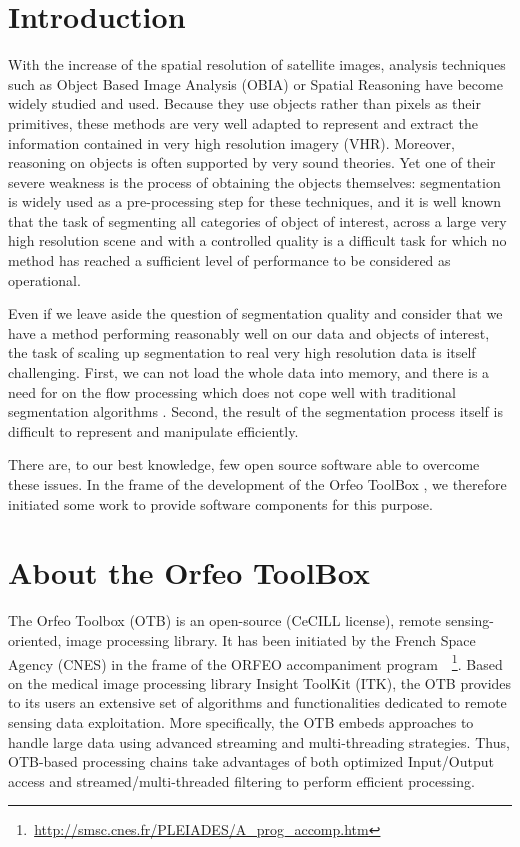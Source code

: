 \documentclass{josis}
\newcommand{\furl}[1]{    $\,$\footnote{$\,$\url{#1}}}
\begin{document}
\section{Introduction}

With the increase of the spatial resolution of satellite images,
analysis techniques such as Object Based Image Analysis (OBIA) or Spatial
Reasoning \cite{inglada2009qualitative} have become widely studied and
used. Because they use objects rather than pixels as their primitives,
these methods are very well adapted to represent and extract the
information contained in very high resolution imagery (VHR). Moreover,
reasoning on objects is often supported by very sound theories. Yet
one of their severe weakness is the process of obtaining the objects
themselves: segmentation is widely used as a pre-processing step for
these techniques, and it is well known that the task of segmenting all
categories of object of interest, across a large very high resolution
scene and with a controlled quality is a difficult task for which no
method has reached a sufficient level of performance to be considered
as operational.

Even if we leave aside the question of segmentation quality and
consider that we have a method performing reasonably well on our data
and objects of interest, the task of scaling up segmentation to real
very high resolution data is itself challenging. First, we can not
load the whole data into memory, and there is a need for on the flow
processing which does not cope well with traditional segmentation
algorithms \cite{shi2000normalized}. Second, the result of the
segmentation process itself is difficult to represent and manipulate
efficiently.

There are, to our best knowledge, few open source software able to
overcome these issues. In the frame of the development of the Orfeo
ToolBox \cite{}, we therefore initiated some work to provide software
components for this purpose.

\section{About the Orfeo ToolBox}

The Orfeo Toolbox (OTB) is an open-source (CeCILL license), remote
sensing-oriented, image processing library. It has been initiated by
the French Space Agency (CNES) in the frame of the ORFEO accompaniment
program~\furl{http://smsc.cnes.fr/PLEIADES/A_prog_accomp.htm}. Based
on the medical image processing library Insight ToolKit (ITK), the OTB
provides to its users an extensive set of algorithms and
functionalities dedicated to remote sensing data exploitation. More
specifically, the OTB embeds approaches to handle large data using
advanced streaming and multi-threading strategies. Thus, OTB-based
processing chains take advantages of both optimized Input/Output
access and streamed/multi-threaded filtering to perform efficient
processing.
\end{document}
